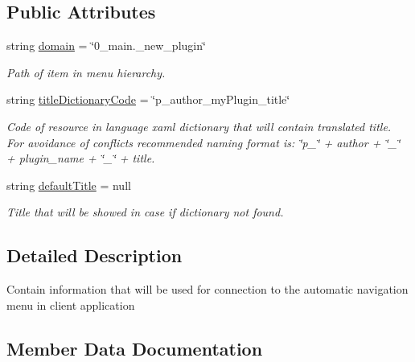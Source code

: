 \subsection*{Public Attributes}
\begin{DoxyCompactItemize}
\item 
string \mbox{\hyperlink{class_uniform_client_1_1_plugins_1_1_menu_item_meta_a5af82221a6390db0d98c7fe9ff1d1985}{domain}} = \char`\"{}0\+\_\+main.\+\_\+new\+\_\+plugin\char`\"{}
\begin{DoxyCompactList}\small\item\em Path of item in menu hierarchy. \end{DoxyCompactList}\item 
string \mbox{\hyperlink{class_uniform_client_1_1_plugins_1_1_menu_item_meta_a7cd04fb564fa2bdd1ac3c0c3af3b9aab}{title\+Dictionary\+Code}} = \char`\"{}p\+\_\+author\+\_\+my\+Plugin\+\_\+title\char`\"{}
\begin{DoxyCompactList}\small\item\em Code of resource in language xaml dictionary that will contain translated title. For avoidance of conflicts recommended naming format is\+: \char`\"{}p\+\_\+\char`\"{} + author + \char`\"{}\+\_\+\char`\"{} + plugin\+\_\+name + \char`\"{}\+\_\+\char`\"{} + title. \end{DoxyCompactList}\item 
string \mbox{\hyperlink{class_uniform_client_1_1_plugins_1_1_menu_item_meta_a3837afc599c411743bb08cd93b9937ad}{default\+Title}} = null
\begin{DoxyCompactList}\small\item\em Title that will be showed in case if dictionary not found. \end{DoxyCompactList}\end{DoxyCompactItemize}


\subsection{Detailed Description}
Contain information that will be used for connection to the automatic navigation menu in client application 



\subsection{Member Data Documentation}
\mbox{\label{class_uniform_client_1_1_plugins_1_1_menu_item_meta_a3837afc599c411743bb08cd93b9937ad}} 
